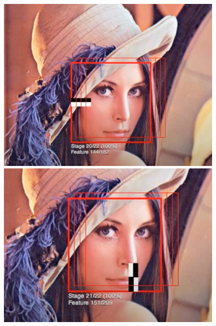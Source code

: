 \documentclass[a4paper]{article}
\begin{document}
\begin{figure}[H]
    \centering
    \begin{minipage}[b]{0.32\textwidth}
        \includegraphics[width=\textwidth]{../img/hf1.png}
    \end{minipage}
    \hfill
    \begin{minipage}[b]{0.32\textwidth}
        \includegraphics[width=\textwidth]{../img/hf2.png}
    \end{minipage}
    \hfill
    \begin{minipage}[b]{0.32\textwidth}

\end{minipage}
\end{figure}
\end{document}
